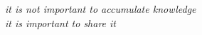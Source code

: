 \thispagestyle{empty}

\vspace*{8cm}

\begin{center}
      {\itshape
      it is not important
      to accumulate knowledge\\
      it is important to share it}
\end{center}
